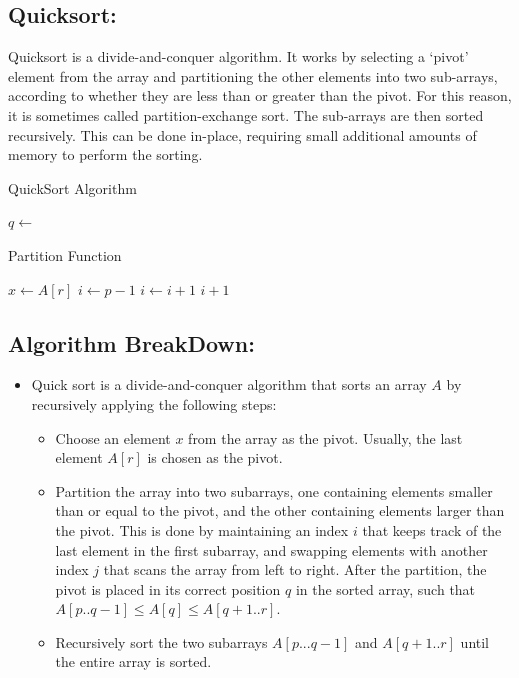 \documentclass[a4paper, 9pt, twocolumn]{article}
\begin{document}
\subsection*{Quicksort:}
Quicksort is a divide-and-conquer algorithm.
It works by selecting a `pivot' element from the array and partitioning the other elements into two sub-arrays,
according to whether they are less than or greater than the pivot.
For this reason, it is sometimes called partition-exchange sort.
The sub-arrays are then sorted recursively.
This can be done in-place, requiring small additional amounts of memory to perform the sorting.\\
\begin{algorithm}[ht]
	\caption{QuickSort Algorithm}
	\begin{algorithmic}[1]
		\State $q \gets$ 
		\State {}
		\State {}
		\EndIf
		\EndFunction
	\end{algorithmic}
\end{algorithm}
\begin{algorithm}[h]
	\caption{Partition Function}
	\begin{algorithmic}[2]
		\State $x \gets A[r]$
		\State $i \gets p-1$
		\State $i \gets i+1$
		\State {}
		\EndIf
		\EndFor
		\State {}
		\State \Return $i+1$
		\EndFunction
	\end{algorithmic}
\end{algorithm}

\newpage
\subsection*{Algorithm BreakDown:}
\begin{itemize}
	\item Quick sort is a divide-and-conquer algorithm that sorts an array $A$ by recursively applying the following steps:\\
	      \begin{itemize}[label={$\circ$}]
		      \item Choose an element $x$ from the array as the pivot. Usually, the last element $A[r]$ is chosen as the pivot.
		      \item Partition the array into two subarrays, one containing elements smaller than or equal to the pivot, and the other containing elements larger than the pivot. This is done by maintaining an index $i$ that keeps track of the last element in the first subarray, and swapping elements with another index $j$ that scans the array from left to right. After the partition, the pivot is placed in its correct position $q$ in the sorted array, such that $A[p..q-1] \leq A[q] \leq A[q+1..r]$.
		      \item Recursively sort the two subarrays $A[p...q-1]$ and $A[q+1..r]$ until the entire array is sorted.
	      \end{itemize}
\end{itemize}
\end{document}
